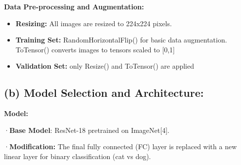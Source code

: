 \textbf{Data Pre-processing and Augmentation:}

\begin{itemize}
\tightlist
\item
  \textbf{Resizing:} All images are resized to 224x224 pixels.
\item
  \textbf{Training Set:} RandomHorizontalFlip() for basic data
  augmentation. ToTensor() converts images to tensors scaled to
  {[}0,1{]}
\item
  \textbf{Validation Set:} only Resize() and ToTensor() are applied
\end{itemize}

\subsection{\texorpdfstring{\textbf{(b)} \textbf{Model Selection and
Architecture:}}{(b) Model Selection and Architecture:}}\label{b-model-selection-and-architecture}

\textbf{Model:}

·\textbf{Base Model}: ResNet-18 pretrained on ImageNet{[}4{]}.

·\textbf{Modification:} The final fully connected (FC) layer is replaced
with a new linear layer for binary classification (cat vs dog).

